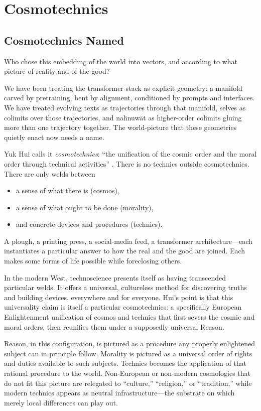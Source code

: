 \chapter{Cosmotechnics}

\section{Cosmotechnics Named}

Who chose this embedding of the world into vectors, and according to what picture of reality and of the good?

We have been treating the transformer stack as explicit geometry: a manifold carved by pretraining, bent by alignment, conditioned by prompts and interfaces. We have treated evolving texts as trajectories through that manifold, selves as colimits over those trajectories, and na\={h}nuw\={a}t as higher-order colimits gluing more than one trajectory together. The world-picture that these geometries quietly enact now needs a name.

Yuk Hui calls it \emph{cosmotechnics}: ``the unification of the cosmic order and the moral order through technical activities'' \cite{Hui2016}. There is no technics outside cosmotechnics. There are only welds between

\begin{itemize}
  \item a sense of what there is (cosmos),
  \item a sense of what ought to be done (morality),
  \item and concrete devices and procedures (technics).
\end{itemize}

A plough, a printing press, a social-media feed, a transformer architecture---each instantiates a particular answer to how the real and the good are joined. Each makes some forms of life possible while foreclosing others.

In the modern West, technoscience presents itself as having transcended particular welds. It offers a universal, cultureless method for discovering truths and building devices, everywhere and for everyone. Hui's point is that this universality claim is itself a particular cosmotechnics: a specifically European Enlightenment unification of cosmos and technics that first severs the cosmic and moral orders, then reunifies them under a supposedly universal Reason.

Reason, in this configuration, is pictured as a procedure any properly enlightened subject can in principle follow. Morality is pictured as a universal order of rights and duties available to such subjects. Technics becomes the application of that rational procedure to the world. Non-European or non-modern cosmologies that do not fit this picture are relegated to ``culture,'' ``religion,'' or ``tradition,'' while modern technics appears as neutral infrastructure---the substrate on which merely local differences can play out.

